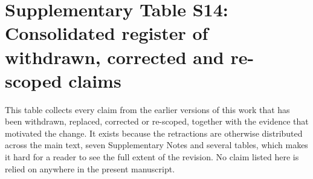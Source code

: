 \documentclass[11pt,a4paper]{article}
\begin{document}
\section*{Supplementary Table S14: Consolidated register of withdrawn, corrected and re-scoped claims}
\label{tab:withdrawals}

This table collects every claim from the earlier versions of this work that has been withdrawn,
replaced, corrected or re-scoped, together with the evidence that motivated the change. It exists
because the retractions are otherwise distributed across the main text, seven Supplementary Notes
and several tables, which makes it hard for a reader to see the full extent of the revision. No
claim listed here is relied on anywhere in the present manuscript.

\vspace{4pt}
\small
\setlength{\tabcolsep}{3pt}
\renewcommand{\arraystretch}{1.3}
\end{document}
